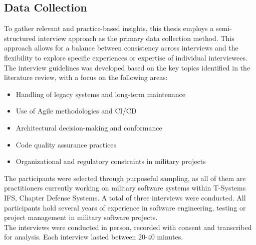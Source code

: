 \subsection{Data Collection}
To gather relevant and practice-based insights, this thesis employs a semi-structured interview approach as the primary data collection method. This approach allows for a balance between consistency across interviews and the flexibility to explore specific experiences or expertise of individual interviewees.
The interview guidelines was developed based on the key topics identified in the literature review, with a focus on the following areas:
\begin{itemize}
    \item Handling of legacy systems and long-term maintenance
    \item Use of Agile methodologies and \ac{CI/CD}
    \item Architectural decision-making and conformance
    \item Code quality assurance practices
    \item Organizational and regulatory constraints in military projects
\end{itemize}
The participants were selected through purposeful sampling, as all of them are practitioners currently working on military software systems within T-Systems IFS, Chapter Defense Systems. A total of three interviews were conducted. All participants hold several years of experience in software engineering, testing or project management
in military software projects.\\
The interviews were conducted in person, recorded with consent and transcribed for analysis. Each interview lasted between 20-40 minutes.
